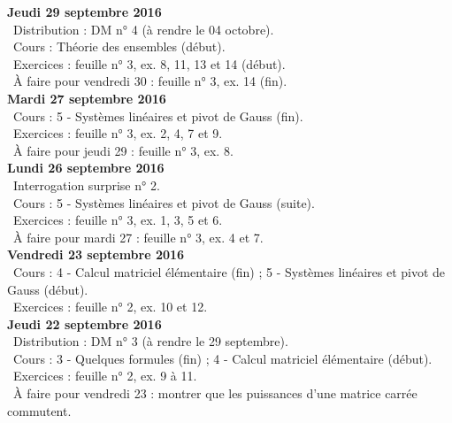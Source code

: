 \documentclass[12pt,a4paper]{article}
\begin{document}
\noindent\textbf{Jeudi 29 septembre 2016}\\
\bu\ Distribution : DM n° 4 (à rendre le 04 octobre).\\
\bu\ Cours : Théorie des ensembles (début).\\
\bu\ Exercices : feuille n° 3, ex. 8, 11, 13 et 14 (début).\\
\bu\ À faire pour vendredi 30 : feuille n° 3, ex. 14 (fin).\vspace{.4cm}\\

\noindent\textbf{\bf Mardi 27 septembre 2016}\\
\bu\ Cours : 5 - Systèmes linéaires et pivot de Gauss (fin).\\
\bu\ Exercices : feuille n° 3, ex. 2, 4, 7 et 9.\\
\bu\ À faire pour jeudi 29 : feuille n° 3, ex. 8.\vspace{.4cm}\\

\noindent\textbf{Lundi 26 septembre 2016}\\
\bu\ Interrogation surprise n° 2.\\
\bu\ Cours : 5 - Systèmes linéaires et pivot de Gauss (suite).\\
\bu\ Exercices : feuille n° 3, ex. 1, 3, 5 et 6.\\
\bu\ À faire pour mardi 27 : feuille n° 3, ex. 4 et 7.\vspace{.4cm}\\

\noindent\textbf{Vendredi 23 septembre 2016}\\
\bu\ Cours : 4 - Calcul matriciel élémentaire (fin) ; 5 - Systèmes linéaires et pivot de Gauss (début).\\
\bu\ Exercices : feuille n° 2, ex. 10 et 12.\vspace{.4cm}\\

\noindent\textbf{Jeudi 22 septembre 2016}\\
\bu\ Distribution : DM n° 3 (à rendre le 29 septembre).\\
\bu\ Cours : 3 - Quelques formules (fin) ; 4 - Calcul matriciel
élémentaire (début).\\
\bu\ Exercices : feuille n° 2, ex. 9 à 11.\\
\bu\ À faire pour vendredi 23 : montrer que les puissances d'une matrice carrée commutent.\vspace{.4cm}\\
\end{document}
